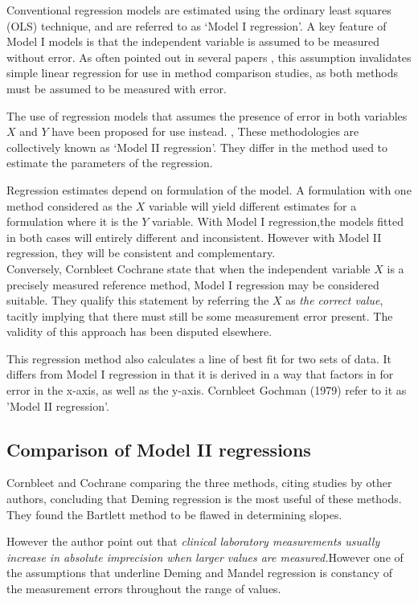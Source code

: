 \documentclass[12pt, a4paper]{report}
\theoremstyle{plain}
\theoremstyle{definition}
\theoremstyle{remark}
\begin{document}
Conventional regression models are estimated using the ordinary least squares (OLS) technique, and are referred to as `Model I regression'\citep{CornCoch,ludbrook97}. A key feature of Model I models is that the independent variable is assumed to be measured without error. As often pointed out in several papers \citep{BA83,ludbrook97}, this assumption invalidates simple linear
regression for use in method comparison studies, as both methods must be assumed to be measured with error.

The use of regression models that assumes the presence of error in both variables $X$ and $Y$ have been proposed for use instead. \citep{CornCoch,ludbrook97}, These methodologies are collectively known as `Model II regression'. They differ in the method used to
estimate the parameters of the regression.

Regression estimates depend on formulation of the model. A formulation with one method considered as the $X$ variable will
yield different estimates for a formulation where it is the $Y$ variable. With Model I regression,the models fitted in both cases
will entirely different and inconsistent. However with Model II
regression, they will be consistent and complementary.
\\
Conversely, Cornbleet Cochrane state that when the independent
variable $X$ is a precisely measured reference method, Model I
regression may be considered suitable. They qualify this statement
by referring the $X$ as \emph{the correct value}, tacitly
implying that there must still be some measurement error present.
The validity of this approach has been disputed elsewhere.

This regression method also calculates a line of best fit for two sets of data. It differs from Model I regression in that it is derived in a way that factors in for error in the x-axis, as well as the y-axis. Cornbleet Gochman (1979) refer to it as 'Model II regression'.

\subsection{Comparison of Model II regressions}
Cornbleet and Cochrane comparing the three methods, citing studies by other authors, concluding that Deming regression is the most useful of these methods. They found the Bartlett method to be
flawed in determining slopes.

However the author point out that \emph{ clinical laboratory measurements usually increase in absolute imprecision when larger values are measured.}However one of the assumptions that underline Deming and Mandel regression is constancy of the measurement errors throughout the range of values.
\end{document}
